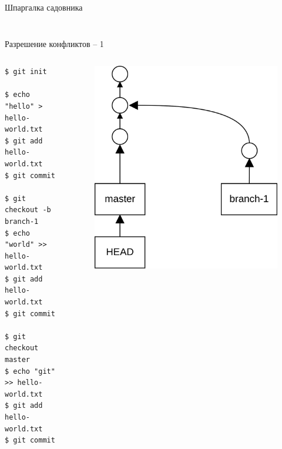 \documentclass[presentation]{beamer}
\begin{document}
\begin{frame}[fragile]{Шпаргалка садовника}
\begin{columns}
\begin{column}{.4\textwidth}
\begin{figure}[htb]
      \end{figure}
    \end{column}
  \end{columns}
\end{frame}


\begin{frame}[fragile]{Разрешение конфликтов -- 1}
  \begin{columns}
    \begin{column}{.6\textwidth}
\begin{verbatim}
$ git init

$ echo "hello" > hello-world.txt
$ git add hello-world.txt
$ git commit

$ git checkout -b branch-1
$ echo "world" >> hello-world.txt
$ git add hello-world.txt
$ git commit

$ git checkout master 
$ echo "git" >> hello-world.txt
$ git add hello-world.txt
$ git commit
\end{verbatim}
      \end{column}
      \begin{column}{.4\textwidth}
        \begin{figure}[htb]
          \centering
          \includegraphics[height=.6\textheight]{git-operation-merge-2-1}
        \end{figure}
      \end{column}
    \end{columns}
\end{frame}
\end{document}

